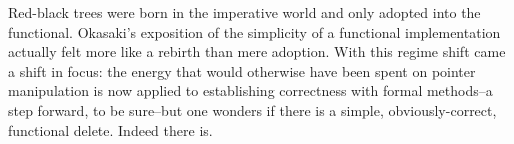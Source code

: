 \documentclass[preprint]{sigplanconf}
\begin{document}












Red-black trees were born in the imperative world and only adopted into the functional. Okasaki's exposition of the simplicity of a functional implementation actually felt more like a rebirth than mere adoption. With this regime shift came a shift in focus: the energy that would otherwise have been spent on pointer manipulation is now applied to establishing correctness with formal methods--a step forward, to be sure--but one wonders if there is a simple, obviously-correct, functional delete. Indeed there is.
\end{document}
